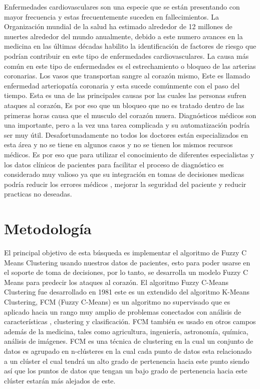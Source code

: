 \documentclass[10pt,journal]{IEEEtran}
\begin{document}
Enfermedades cardiovasculares son una especie que se están presentando con mayor frecuencia y estas frecuentemente suceden en fallecimientos. La Organización mundial de la salud ha estimado alrededor de 12 millones de muertes alrededor del mundo anualmente, debido a este numero avances en la medicina en las últimas décadas habilito la identificación de factores de riesgo que podrían contribuir en este tipo de enfermedades cardiovasculares. La causa más común en este tipo de enfermedades es el estrechamiento o bloqueo de las arterias coronarias. Los vasos que transportan sangre al corazón mismo, Este es llamado enfermedad arteriopatía coronaria y esta sucede comúnmente con el paso del tiempo. Esta es una de las principales causas por las cuales las personas sufren ataques al corazón, Es por eso que un bloqueo que no es tratado dentro de las primeras horas causa que el musculo del corazón muera. Diagnósticos médicos son una importante, pero a la vez una tarea complicada y su automatización podría ser muy útil. Desafortunadamente no todos los doctores están especializados en esta área y no se tiene en algunos casos y no se tienen los mismos recursos médicos. Es por eso que para utilizar el conocimiento de diferentes especialistas y los datos clínicos de pacientes para facilitar el proceso de diagnóstico es considerado muy valioso ya que su integración en tomas de decisiones medicas podría reducir los errores médicos , mejorar la seguridad del paciente y reducir practicas no deseadas.

\section{Metodología}
\label{sec:metodologia}



El principal objetivo de esta búsqueda es implementar el algoritmo de Fuzzy C Means Clustering usando nuestros datos de pacientes, esto para poder usarse en el soporte de toma de decisiones, por lo tanto, se desarrolla un modelo Fuzzy C Means para predecir los ataques al corazón.
El algoritmo Fuzzy C-Means Clustering fue desarrollado en 1981 este es un extendido del algoritmo K-Means Clustering,  FCM (Fuzzy C-Means) es un algoritmo no supervisado que es aplicado hacia un rango muy amplio de problemas conectados con análisis de características , clustering y clasificación. FCM también es usado en otros campos además de la medicina, tales como agricultura, ingeniería, astronomía, química, análisis de imágenes.
FCM es una técnica de clustering en la cual un conjunto de datos es agrupado en n-clústeres en la cual cada punto de datos esta relacionado a un clúster el cual tendrá un alto grado de pertenencia hacia este punto siendo así que los puntos de datos que tengan un bajo grado de pertenencia hacia este clúster estarán más alejados de este.
\end{document}

